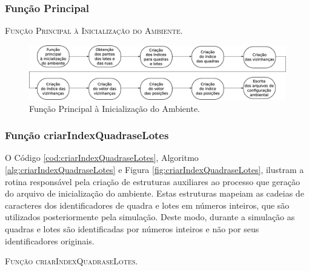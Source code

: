 \subsubsection{Função Principal}



\begin{algorithm}[H]
   \SetAlgoLined   
   
   \caption{\textsc{Função Principal à Inicialização do Ambiente.}}
   \label{alg:mainAmb}
\end{algorithm}

\begin{figure}[H]
  \centering
  \includegraphics[width=1\textwidth]{Figuras/Simula/Fluxos/Main.eps}
  \caption{Função Principal à Inicialização do Ambiente.}
  \label{fig:mainAmb}
\end{figure} 

\newpage

\subsubsection{Função criarIndexQuadraseLotes}

O Código \ref{cod:criarIndexQuadraseLotes}, Algoritmo \ref{alg:criarIndexQuadraseLotes} e Figura \ref{fig:criarIndexQuadraseLotes}, ilustram a rotina responsável pela criação de estruturas auxiliares ao processo que geração do arquivo de inicialização do ambiente. Estas estruturas mapeiam as cadeias de caracteres dos identificadores de quadra e lotes em números inteiros, que são utilizados posteriormente pela simulação. Deste modo, durante a simulação as quadras e lotes são identificadas por números inteiros e não por seus identificadores originais. 



\begin{algorithm}[H]
   \SetAlgoLined   
   
   \caption{\textsc{Função criarIndexQuadraseLotes.}}
   \label{alg:criarIndexQuadraseLotes}
\end{algorithm}

